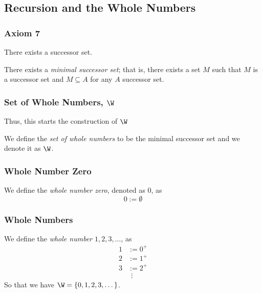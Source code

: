 \subsection{Recursion and the Whole Numbers}

        \subsubsection{Axiom 7}

            \begin{axiom}
                There exists a successor set.
            \end{axiom}

            \begin{corollary}
                There exists a \textit{minimal successor set}; that is, there exists a set $M$ such that $M$ is a successor set and $M\subseteq A$ for any $A$ successor set.
            \end{corollary}

        \subsubsection{Set of Whole Numbers, $\W$}

            Thus, this starts the construction of $\W$

            \begin{definition}
                We define the \textit{set of whole numbers} to be the minimal successor set and we denote it as $\W$.
            \end{definition}

        \subsubsection{Whole Number Zero}

            \begin{definition}
                We define the \textit{whole number zero}, denoted as $0$, as $$0 := \emptyset$$
            \end{definition}

        \subsubsection{Whole Numbers}

            \begin{definition}
                We define the \textit{whole number} $1,2,3,\dots$, as 
                \begin{align*}
                    1 &:= 0^+ \\
                    2 &:= 1^+ \\
                    3 &:= 2^+ \\
                    & \ \ \vdots
                \end{align*}
                So that we have $\W = \{0,1,2,3,\dots\}$.
            \end{definition}

